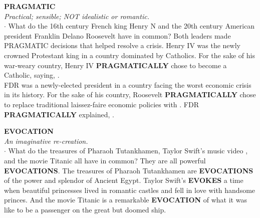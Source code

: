 \documentclass{exam}
\begin{document}
\begin{questions}
\question \textbf{PRAGMATIC}\\ \textit{Practical; sensible; NOT idealistic or romantic.}\\

$\cdot$ What do the 16th century French king Henry N and
the 20th century American president Franklin Delano
Roosevelt have in common? Both leaders made
PRAGMATIC decisions that helped resolve a crisis.
Henry IV was the newly crowned Protestant king in a
country dominated by Catholics. For the sake of his
war-weary country, Henry IV \textbf{PRAGMATICALLY}
chose to become a Catholic, saying, .\\
FDR was a newly-elected president in a country facing
the worst economic crisis in its history. For the sake of
his country, Roosevelt \textbf{PRAGMATICALLY} chose to replace traditional laissez-faire economic policies with
. FDR \textbf{PRAGMATICALLY} explained, .

\question  \textbf{EVOCATION}\\
\textit{An imaginative re-creation.}\\

$ \cdot $ What do the treasures of Pharaoh Tutankhamen,
Taylor Swift's music video , and the
movie Titanic all have in common? They are all
powerful \textbf{EVOCATIONS}. The treasures of Pharaoh
Tutankhamen are \textbf{EVOCATIONS} of the power and
splendor of Ancient Egypt. Taylor Swift's 
\textbf{EVOKES} a time when beautiful princesses lived in
romantic castles and fell in love with handsome
princes. And the movie Titanic is a remarkable
\textbf{EVOCATION} of what it was like to be a passenger on
the great but doomed ship.


\end{questions}
\end{document}

